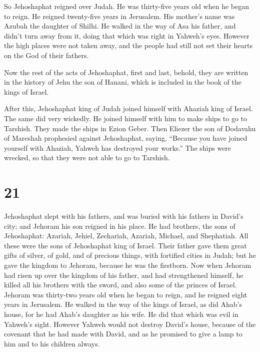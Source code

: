  So Jehoshaphat reigned over Judah. He was thirty-five
years old when he began to reign. He reigned twenty-five years in
Jerusalem. His mother's name was Azubah the daughter of Shilhi.
 He walked in the way of Asa his father, and didn't turn
away from it, doing that which was right in Yahweh's eyes. 
However the high places were not taken away, and the people had still
not set their hearts on the God of their fathers.

 Now the rest of the acts of Jehoshaphat, first and last,
behold, they are written in the history of Jehu the son of Hanani, which
is included in the book of the kings of Israel.

 After this, Jehoshaphat king of Judah joined himself with
Ahaziah king of Israel. The same did very wickedly.  He
joined himself with him to make ships to go to Tarshish. They made the
ships in Ezion Geber.  Then Eliezer the son of Dodavahu of
Mareshah prophesied against Jehoshaphat, saying, ``Because you have
joined yourself with Ahaziah, Yahweh has destroyed your works.'' The
ships were wrecked, so that they were not able to go to Tarshish.

\hypertarget{section-20}{%
\section{21}\label{section-20}}

 Jehoshaphat slept with his fathers, and was buried with his
fathers in David's city; and Jehoram his son reigned in his place.
 He had brothers, the sons of Jehoshaphat: Azariah, Jehiel,
Zechariah, Azariah, Michael, and Shephatiah. All these were the sons of
Jehoshaphat king of Israel.  Their father gave them great
gifts of silver, of gold, and of precious things, with fortified cities
in Judah; but he gave the kingdom to Jehoram, because he was the
firstborn.  Now when Jehoram had risen up over the kingdom
of his father, and had strengthened himself, he killed all his brothers
with the sword, and also some of the princes of Israel. 
Jehoram was thirty-two years old when he began to reign, and he reigned
eight years in Jerusalem.  He walked in the way of the kings
of Israel, as did Ahab's house, for he had Ahab's daughter as his wife.
He did that which was evil in Yahweh's sight.  However
Yahweh would not destroy David's house, because of the covenant that he
had made with David, and as he promised to give a lamp to him and to his
children always.

